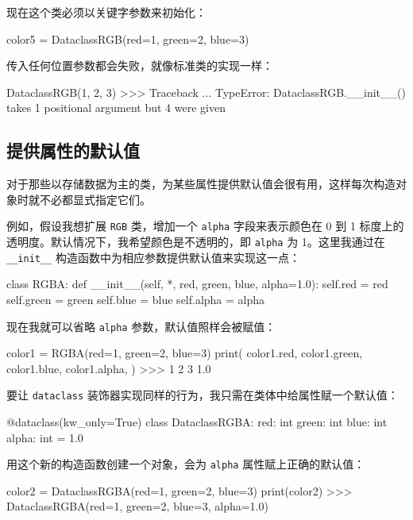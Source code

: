 现在这个类必须以关键字参数来初始化：

\begin{codebox}[python]
color5 = DataclassRGB(red=1, green=2, blue=3)
\end{codebox}

传入任何位置参数都会失败，就像标准类的实现一样：

\begin{codebox}[python]
DataclassRGB(1, 2, 3)
>>>
Traceback ...
TypeError: DataclassRGB.__init__() takes 1 positional argument
but 4 were given
\end{codebox}

\subsection{提供属性的默认值}

对于那些以存储数据为主的类，为某些属性提供默认值会很有用，这样每次构造对象时就不必都显式指定它们。

例如，假设我想扩展 \texttt{RGB} 类，增加一个 \texttt{alpha} 字段来表示颜色在 0 到 1 标度上的透明度。默认情况下，我希望颜色是不透明的，即 \texttt{alpha} 为 1。这里我通过在 \texttt{\_\_init\_\_} 构造函数中为相应参数提供默认值来实现这一点：

\begin{codebox}[python]
class RGBA:
    def __init__(self, *, red, green, blue, alpha=1.0):
        self.red = red
        self.green = green
        self.blue = blue
        self.alpha = alpha
\end{codebox}

现在我就可以省略 \texttt{alpha} 参数，默认值照样会被赋值：

\begin{codebox}[python]
color1 = RGBA(red=1, green=2, blue=3)
print(
    color1.red,
    color1.green,
    color1.blue,
    color1.alpha,
)
>>>
1 2 3 1.0
\end{codebox}

要让 \texttt{dataclass} 装饰器实现同样的行为，我只需在类体中给属性赋一个默认值：

\begin{codebox}[python]
@dataclass(kw_only=True)
class DataclassRGBA:
    red: int
    green: int
    blue: int
    alpha: int = 1.0
\end{codebox}

用这个新的构造函数创建一个对象，会为 \texttt{alpha} 属性赋上正确的默认值：

\begin{codebox}[python]
color2 = DataclassRGBA(red=1, green=2, blue=3)
print(color2)
>>>
DataclassRGBA(red=1, green=2, blue=3, alpha=1.0)
\end{codebox}

